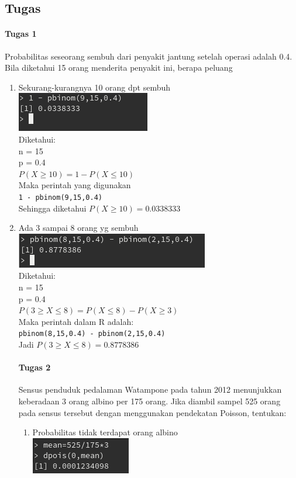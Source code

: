 \documentclass[a4paper,12pt]{article}
\begin{document}
\subsection{Tugas}
\paragraph{Tugas 1\\}
Probabilitas seseorang sembuh dari penyakit jantung setelah operasi adalah 0.4. Bila
diketahui 15 orang menderita penyakit ini, berapa peluang
\begin{enumerate}[label = \alph*.]
	\item Sekurang-kurangnya 10 orang dpt sembuh\\
	\includegraphics{tugas1a}\\
	Diketahui: \\
	n = 15\\
	p = 0.4\\
	$P(X \geq 10) = 1 - P(X \leq 10)$\\
	Maka perintah yang digunakan\\
	\texttt{1 - pbinom(9,15,0.4)}\\
	Sehingga diketahui $P(X \geq 10) = 0.0338333$
	
	\item Ada 3 sampai 8 orang yg sembuh\\
	\includegraphics{tugas1b} \\
	Diketahui:\\
	n = 15\\
	p = 0.4\\
	$P(3 \geq X \leq 8) = P(X \leq 8) - P(X \geq 3)$\\
	Maka perintah dalam R adalah:\\
	\texttt{pbinom(8,15,0.4) - pbinom(2,15,0.4)}\\
	Jadi $P(3 \geq X \leq 8) = 0.8778386$
	
	\paragraph{Tugas 2\\}
	Sensus penduduk pedalaman Watampone pada tahun 2012 menunjukkan keberadaan 3
	orang albino per 175 orang. Jika diambil sampel 525 orang pada sensus tersebut dengan
	menggunakan pendekatan Poisson, tentukan:
	\begin{enumerate}[label=\alph*.]
		\item Probabilitas tidak terdapat orang albino\\
		\includegraphics{tugas2a}
	\end{enumerate}
	
\end{enumerate}
\end{document}
